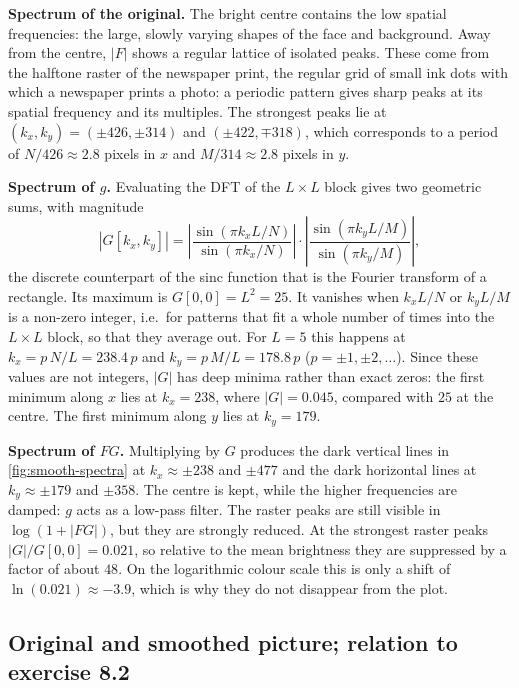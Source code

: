 \textbf{Spectrum of the original.} The bright centre contains the low spatial frequencies: the large, slowly varying shapes of the face and background. Away from the centre, $|F|$ shows a regular lattice of isolated peaks. These come from the halftone raster of the newspaper print, the regular grid of small ink dots with which a newspaper prints a photo: a periodic pattern gives sharp peaks at its spatial frequency and its multiples. The strongest peaks lie at $(k_x, k_y) = (\pm 426, \pm 314)$ and $(\pm 422, \mp 318)$, which corresponds to a period of $N/426 \approx 2.8$ pixels in $x$ and $M/314 \approx 2.8$ pixels in $y$.

\textbf{Spectrum of $g$.} Evaluating the DFT of the $L \times L$ block gives two geometric sums, with magnitude
\[
|G[k_x, k_y]| = \left| \frac{\sin(\pi k_x L / N)}{\sin(\pi k_x / N)} \right| \cdot \left| \frac{\sin(\pi k_y L / M)}{\sin(\pi k_y / M)} \right|,
\]
the discrete counterpart of the sinc function that is the Fourier transform of a rectangle. Its maximum is $G[0,0] = L^2 = 25$. It vanishes when $k_x L / N$ or $k_y L / M$ is a non-zero integer, i.e.\ for patterns that fit a whole number of times into the $L \times L$ block, so that they average out. For $L = 5$ this happens at $k_x = p\,N/L = 238.4\,p$ and $k_y = p\,M/L = 178.8\,p$ ($p = \pm 1, \pm 2, \dots$). Since these values are not integers, $|G|$ has deep minima rather than exact zeros: the first minimum along $x$ lies at $k_x = 238$, where $|G| = 0.045$, compared with $25$ at the centre. The first minimum along $y$ lies at $k_y = 179$.

\textbf{Spectrum of $FG$.} Multiplying by $G$ produces the dark vertical lines in \cref{fig:smooth-spectra} at $k_x \approx \pm 238$ and $\pm 477$ and the dark horizontal lines at $k_y \approx \pm 179$ and $\pm 358$. The centre is kept, while the higher frequencies are damped: $g$ acts as a low-pass filter. The raster peaks are still visible in $\log(1 + |FG|)$, but they are strongly reduced. At the strongest raster peaks $|G| / G[0,0] = 0.021$, so relative to the mean brightness they are suppressed by a factor of about $48$. On the logarithmic colour scale this is only a shift of $\ln(0.021) \approx -3.9$, which is why they do not disappear from the plot.

\subsection*{Original and smoothed picture; relation to exercise 8.2}

